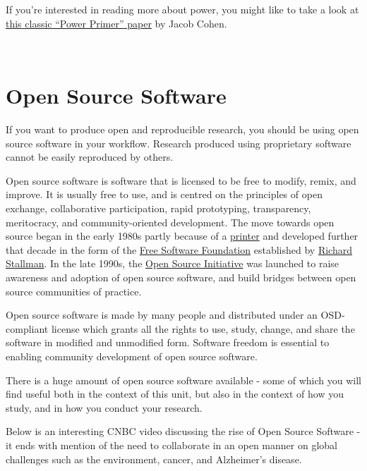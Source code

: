\documentclass[
]{book}
\begin{document}
~~

~~

If you're interested in reading more about power, you might like to take a look at \href{https://pubmed.ncbi.nlm.nih.gov/19565683/}{this classic ``Power Primer'' paper} by Jacob Cohen.

~~

\hypertarget{open-source-software}{%
\section{Open Source Software}\label{open-source-software}}

If you want to produce open and reproducible research, you should be using open source software in your workflow. Research produced using proprietary software cannot be easily reproduced by others.

Open source software is software that is licensed to be free to modify, remix, and improve. It is usually free to use, and is centred on the principles of open exchange, collaborative participation, rapid prototyping, transparency, meritocracy, and community-oriented development. The move towards open source began in the early 1980s partly because of a \href{https://medium.com/@amogh/the-story-of-open-source-so-far-bfcb685d85a4}{printer} and developed further that decade in the form of the \href{https://en.wikipedia.org/wiki/Free_Software_Foundation}{Free Software Foundation} established by \href{https://en.wikipedia.org/wiki/Richard_Stallman}{Richard Stallman}. In the late 1990s, the \href{https://opensource.org}{Open Source Initiative} was launched to raise awareness and adoption of open source software, and build bridges between open source communities of practice.

Open source software is made by many people and distributed under an OSD-compliant license which grants all the rights to use, study, change, and share the software in modified and unmodified form. Software freedom is essential to enabling community development of open source software.

There is a huge amount of open source software available - some of which you will find useful both in the context of this unit, but also in the context of how you study, and in how you conduct your research.

Below is an interesting CNBC video discussing the rise of Open Source Software - it ends with mention of the need to collaborate in an open manner on global challenges such as the environment, cancer, and Alzheimer's disease.
\end{document}
